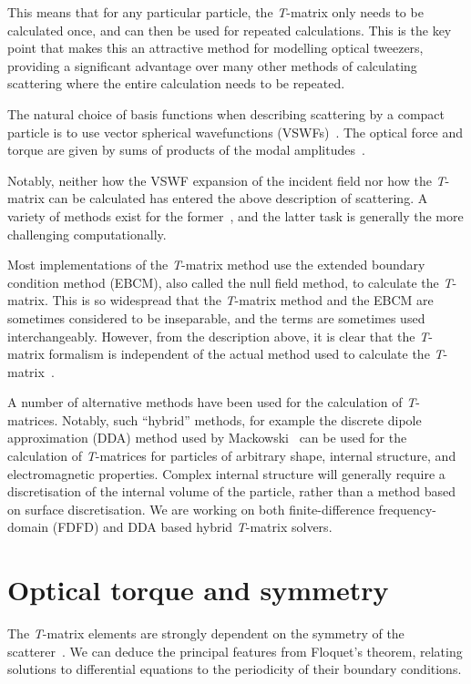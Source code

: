 \documentclass{article}
\begin{document}
This means
that for any particular particle, the \textit{T}-matrix only needs to be
calculated once, and can then be used for repeated calculations.
This is the key point that makes this an attractive method for modelling
optical tweezers, providing a
significant advantage over many other methods of calculating scattering where
the entire calculation needs to be repeated.

The natural choice of basis functions when describing scattering
by a compact particle is to use vector spherical wavefunctions
(VSWFs)~\cite{waterman1971}.
The optical force and torque are given by sums of products of the modal
amplitudes~\cite{farsund1996,crichton2000,nieminen2004d}.

Notably, neither how the VSWF expansion of the incident field nor how
the \textit{T}-matrix can be calculated has entered the above description
of scattering.
A variety of methods exist for the
former~\cite{nieminen2003a,nieminen2004d}, and the latter task is generally
the more challenging computationally.

Most implementations of the \textit{T}-matrix method use the extended
boundary condition method (EBCM), also called the null field method, to
calculate the \textit{T}-matrix. This is so widespread that the
\textit{T}-matrix method and the EBCM are sometimes considered to be
inseparable, and the terms are sometimes used interchangeably.
However, from the description above, it is clear that the \textit{T}-matrix
formalism is independent of the actual method used to calculate the
\textit{T}-matrix~\cite{kahnert2003b,nieminen2003b}.

A number of alternative methods have been used for the calculation of
\textit{T}-matrices.
Notably, such ``hybrid'' methods, for example the discrete dipole
approximation (DDA) method used by
Mackowski~\cite{mackowski2002} can be used for the calculation of
\textit{T}-matrices for particles of arbitrary shape, internal structure,
and electromagnetic properties. Complex internal structure will generally
require a discretisation of the internal volume of the particle, rather
than a method based on surface discretisation. We are working on
both finite-difference frequency-domain (FDFD) and DDA
based hybrid \textit{T}-matrix solvers.

\section{Optical torque and symmetry}

The \textit{T}-matrix elements are strongly dependent on the symmetry
of the scatterer~\cite{waterman1971}. We can deduce the principal features
from Floquet's theorem, relating solutions to differential equations to
the periodicity of their boundary conditions.
\end{document}
